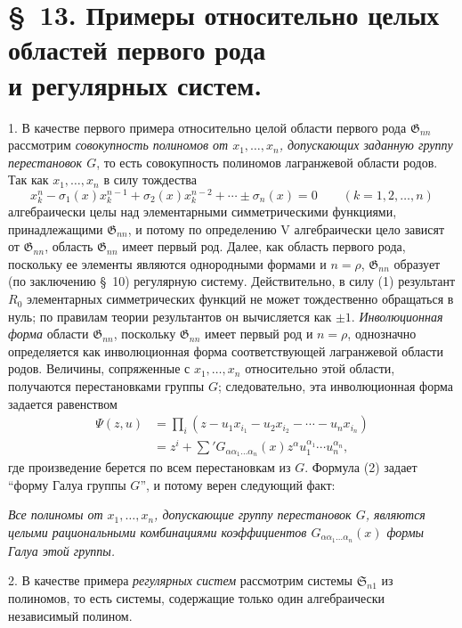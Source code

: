 \documentclass[11pt]{article}
\providecommand{\Ssys}{\mathfrak{S}}
\providecommand{\Gdom}{\mathfrak{G}}
\begin{document}
\section*{\S\ 13. Примеры относительно целых областей первого рода\\ и регулярных систем.}

1. В качестве первого примера относительно целой области первого рода $\Gdom_{nn}$ рассмотрим \emph{совокупность полиномов от $x_1,\ldots,x_n$, допускающих заданную группу перестановок $G$}, то есть совокупность полиномов лагранжевой области родов. Так как $x_1,\ldots,x_n$ в силу тождества
\begin{equation}
  x_k^n-\sigma_1(x)x_k^{n-1}+\sigma_2(x)x_k^{n-2}+\cdots\pm\sigma_n(x)=0
  \qquad(k=1,2,\ldots,n)
\tag{1}
\end{equation}
алгебраически целы над элементарными симметрическими функциями, принадлежащими $\Gdom_{nn}$, и потому по определению V алгебраически цело зависят от $\Gdom_{nn}$, область $\Gdom_{nn}$ имеет первый род. Далее, как область первого рода, поскольку ее элементы являются однородными формами и $n=\rho$, $\Gdom_{nn}$ образует (по заключению \S\ 10) регулярную систему. Действительно, в силу (1) результант $R_0$ элементарных симметрических функций не может тождественно обращаться в нуль; по правилам теории результантов он вычисляется как $\pm1$. \emph{Инволюционная форма} области $\Gdom_{nn}$, поскольку $\Gdom_{nn}$ имеет первый род и $n=\rho$, однозначно определяется как инволюционная форма соответствующей лагранжевой области родов. Величины, сопряженные с $x_1,\ldots,x_n$ относительно этой области, получаются перестановками группы $G$; следовательно, эта инволюционная форма задается равенством
\begin{equation}
\begin{aligned}
  \Psi(z,u)&=\prod_i
  (z-u_1x_{i_1}-u_2x_{i_2}-\cdots-u_nx_{i_n})\\
  &=z^i+\sum{}'G_{\alpha\alpha_1\ldots\alpha_n}(x)
  z^\alpha u_1^{\alpha_1}\cdots u_n^{\alpha_n},
\end{aligned}
\tag{2}
\end{equation}
где произведение берется по всем перестановкам из $G$. Формула (2) задает ``форму Галуа группы $G$'', и потому верен следующий факт:

\emph{Все полиномы от $x_1,\ldots,x_n$, допускающие группу перестановок $G$, являются целыми рациональными комбинациями коэффициентов $G_{\alpha\alpha_1\ldots\alpha_n}(x)$ формы Галуа этой группы.}

2. В качестве примера \emph{регулярных систем} рассмотрим системы $\Ssys_{n1}$ из полиномов, то есть системы, содержащие только один алгебраически независимый полином.
\end{document}
